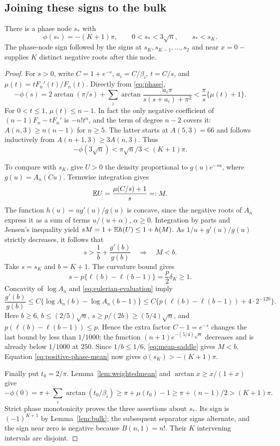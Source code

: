 \subsection{Joining these signs to the bulk}
\begin{lemma}\label{lem:small}
There is a phase node $s_*$ with
\[
\phi(s_*)=-(K+1)\pi,\qquad 0<s_*<3\sqrt n,\qquad s_*<s_K.
\]
The phase-node sign followed by the signs at $s_K,s_{K-1},\ldots,s_2$ and near $x=0-$ supplies $K$ distinct negative roots after this node.
\end{lemma}
\begin{proof}
For $s>0$, write $C=1+e^{-s}$, $a_i=C/\beta_i$, $t=C/s$, and
$\mu(t)=tF_n'(t)/F_n(t)$. Directly from \eqref{eq:phase},
\begin{equation}\label{eq:positive-phase-mean}
-\phi(s)=2\arctan(\pi/s)
+\sum_i\arctan\frac{a_i\pi}{s(s+a_i)+\pi^2}
<\frac{\pi}{s}\{\mu(t)+1\}.
\end{equation}
For $0<t\le1$, $\mu(t)\le n-1$. In fact the only negative coefficient of
$(n-1)F_n-tF_n'$ is $-n!t^n$, and the term of degree $n-2$ covers it:
$A(n,3)\ge n(n-1)$ for $n\ge5$. The latter starts at $A(5,3)=66$ and follows inductively from $A(n+1,3)\ge3A(n,3)$. Thus
\[
-\phi(3\sqrt n)<\pi\sqrt n/3<(K+1)\pi.
\]

To compare with $s_K$, give $U>0$ the density proportional to
$g(u)e^{-su}$, where $g(u)=A_n(Cu)$. Termwise integration gives
\[
\mathbb E U=\frac{\mu(C/s)+1}{s}=:M.
\]
The function $h(u)=ug'(u)/g(u)$ is concave, since the negative roots of $A_n$ express it as a sum of terms $u/(u+\alpha)$, $\alpha\ge0$. Integration by parts and Jensen's inequality yield
$sM=1+\mathbb E h(U)\le1+h(M)$.
As $1/u+g'(u)/g(u)$ strictly decreases, it follows that
\begin{equation}\label{eq:mean-saddle}
s>\frac1b+\frac{g'(b)}{g(b)}\quad\Longrightarrow\quad M<b.
\end{equation}
Take $s=s_K$ and $b=K+1$. The curvature bound gives
\[
s-p\{\ell(b)-\ell(b-1)\}=\frac p2\delta_K\ge1.
\]
Concavity of $\log A_n$ and \eqref{eq:eulerian-evaluation} imply
\[
\frac{g'(b)}{g(b)}
\le C\{\log A_n(b)-\log A_n(b-1)\}
\le C\{p(\ell(b)-\ell(b-1))+4\cdot2^{-120}\}.
\]
Here $b\ge6$, $b\le(2/5)\sqrt n$, $s\ge p/(2b)\ge(5/4)\sqrt n$, and
$p(\ell(b)-\ell(b-1))\le p$. Hence the extra factor $C-1=e^{-s}$ changes the last bound by less than $1/1000$; the function
$(n+1)e^{-(5/4)\sqrt n}$ decreases and is already below $1/1000$ at $250$.
Since $1/b\le1/6$, \eqref{eq:mean-saddle} gives $M<b$. Equation
\eqref{eq:positive-phase-mean} now gives $\phi(s_K)>-(K+1)\pi$.

Finally put $t_0=2/\pi$. Lemma~\ref{lem:weightedmean} and
$\arctan x\ge x/(1+x)$ give
\[
-\phi(0)=\pi+\sum_i\arctan(t_0/\beta_i)
\ge\pi+\mu(t_0)-1
\ge\pi+(n-1)/2>(K+1)\pi.
\]
Strict phase monotonicity proves the three assertions about $s_*$. Its sign is $(-1)^{K+1}$ by Lemma~\ref{lem:bulk}; the subsequent separator signs alternate, and the sign near zero is negative because $B(n,1)=n!$. Their $K$ intervening intervals are disjoint.
\end{proof}
